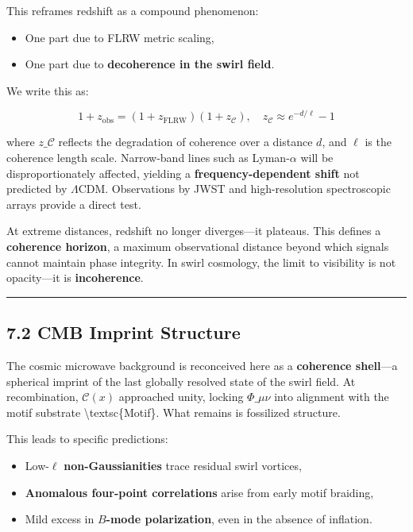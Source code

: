 \documentclass[
  11pt,
]{article}
\providecommand{\tightlist}{%
  \setlength{\itemsep}{0pt}\setlength{\parskip}{0pt}}
\begin{document}
This reframes redshift as a compound phenomenon:

\begin{itemize}
\tightlist
\item
  One part due to FLRW metric scaling,
\item
  One part due to \textbf{decoherence in the swirl field}.
\end{itemize}

We write this as:

\[
1 + z_{\text{obs}} = (1 + z_{\text{FLRW}})(1 + z_{\mathcal{C}}), \quad z_{\mathcal{C}} \approx e^{-d/\ell} - 1
\]

where \(z\_{\mathcal{C}}\) reflects the degradation of coherence over a
distance \(d\), and \(\ell\) is the coherence length scale. Narrow-band
lines such as Lyman-\(\alpha\) will be disproportionately affected,
yielding a \textbf{frequency-dependent shift} not predicted by
\(\Lambda\)CDM. Observations by JWST and high-resolution spectroscopic
arrays provide a direct test.

At extreme distances, redshift no longer diverges---it plateaus. This
defines a \textbf{coherence horizon}, a maximum observational distance
beyond which signals cannot maintain phase integrity. In swirl
cosmology, the limit to visibility is not opacity---it is
\textbf{incoherence}.

\begin{center}\rule{0.5\linewidth}{0.5pt}\end{center}

\subsection{7.2 CMB Imprint Structure}\label{cmb-imprint-structure}

The cosmic microwave background is reconceived here as a
\textbf{coherence shell}---a spherical imprint of the last globally
resolved state of the swirl field. At recombination, \(\mathcal{C}(x)\)
approached unity, locking \(\Phi\_{\mu\nu}\) into alignment with the
motif substrate \textbackslash textsc\{Motif\}. What remains is
fossilized structure.

This leads to specific predictions:

\begin{itemize}
\tightlist
\item
  Low-\(\ell\) \textbf{non-Gaussianities} trace residual swirl vortices,
\item
  \textbf{Anomalous four-point correlations} arise from early motif
  braiding,
\item
  Mild excess in \textbf{\(B\)-mode polarization}, even in the absence
  of inflation.
\end{itemize}
\end{document}
